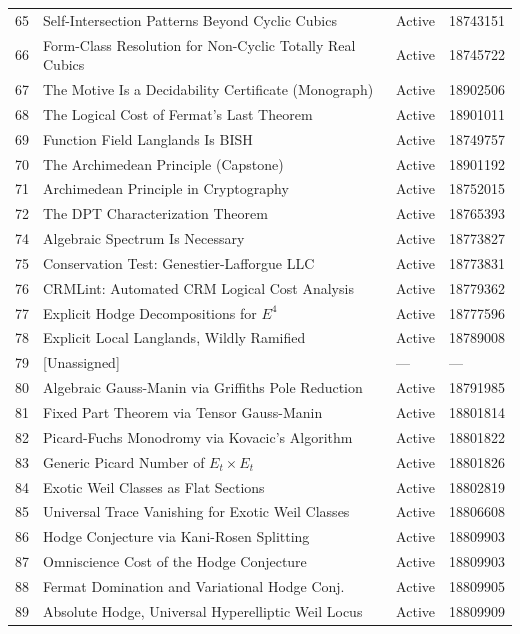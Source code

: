 \documentclass[11pt,twoside,openany]{report}
\theoremstyle{remark}
\newcommand{\BISH}{\textsf{BISH}}
\begin{document}
\begin{longtable}{@{}r p{7.5cm} l l@{}}
 65 & Self-Intersection Patterns Beyond Cyclic Cubics & Active & 18743151 \\
 66 & Form-Class Resolution for Non-Cyclic Totally Real Cubics & Active & 18745722 \\
 67 & The Motive Is a Decidability Certificate (Monograph) & Active & 18902506 \\
 68 & The Logical Cost of Fermat's Last Theorem & Active & 18901011 \\
 69 & Function Field Langlands Is \BISH & Active & 18749757 \\
 70 & The Archimedean Principle (Capstone) & Active & 18901192 \\
 71 & Archimedean Principle in Cryptography & Active & 18752015 \\
 72 & The DPT Characterization Theorem & Active & 18765393 \\
 74 & Algebraic Spectrum Is Necessary & Active & 18773827 \\
 75 & Conservation Test: Genestier-Lafforgue LLC & Active & 18773831 \\
\midrule
 76 & CRMLint: Automated CRM Logical Cost Analysis & Active & 18779362 \\
 77 & Explicit Hodge Decompositions for $E^4$ & Active & 18777596 \\
 78 & Explicit Local Langlands, Wildly Ramified & Active & 18789008 \\
 79 & [Unassigned] & --- & --- \\
 80 & Algebraic Gauss-Manin via Griffiths Pole Reduction & Active & 18791985 \\
 81 & Fixed Part Theorem via Tensor Gauss-Manin & Active & 18801814 \\
 82 & Picard-Fuchs Monodromy via Kovacic's Algorithm & Active & 18801822 \\
 83 & Generic Picard Number of $E_t \times E_t$ & Active & 18801826 \\
 84 & Exotic Weil Classes as Flat Sections & Active & 18802819 \\
 85 & Universal Trace Vanishing for Exotic Weil Classes & Active & 18806608 \\
 86 & Hodge Conjecture via Kani-Rosen Splitting & Active & 18809903 \\
 87 & Omniscience Cost of the Hodge Conjecture & Active & 18809903 \\
 88 & Fermat Domination and Variational Hodge Conj.\ & Active & 18809905 \\
 89 & Absolute Hodge, Universal Hyperelliptic Weil Locus & Active & 18809909 \\

\end{longtable}
\end{document}
